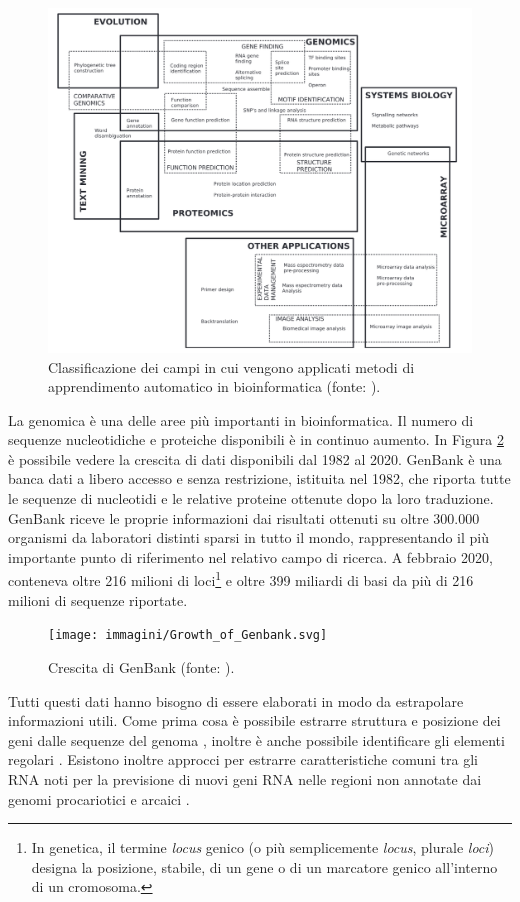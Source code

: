 \documentclass[12pt,italian]{report}
\begin{document}
	\begin{figure}[h]
		\centering
		\includegraphics[width=1\linewidth]{immagini/utilizziMachineLearningBioinfo}
		\caption[]{Classificazione dei campi in cui vengono applicati metodi di apprendimento automatico in bioinformatica (fonte: \cite{Machine_Learning_in_Bioinformatics}).}
		\label{fig:utilizzimachinelearningbioinfo}
	\end{figure}

	La genomica è una delle aree più importanti in bioinformatica. Il numero di sequenze nucleotidiche e proteiche disponibili è in continuo aumento. In Figura \ref{fig:growthofgenbank} è possibile vedere la crescita di dati disponibili dal 1982 al 2020. GenBank è una banca dati a libero accesso e senza restrizione, istituita nel 1982, che riporta tutte le sequenze di nucleotidi e le relative proteine ottenute dopo la loro traduzione. GenBank riceve le proprie informazioni dai risultati ottenuti su oltre 300.000 organismi da laboratori distinti sparsi in tutto il mondo, rappresentando il più importante punto di riferimento nel relativo campo di ricerca. A febbraio 2020, conteneva oltre 216 milioni di loci\footnote{In genetica, il termine \textit{locus} genico (o più semplicemente \textit{locus}, plurale \textit{loci}) designa la posizione, stabile, di un gene o di un marcatore genico all'interno di un cromosoma.} e oltre 399 miliardi di basi da più di 216 milioni di sequenze riportate.

	\begin{figure}[h]
		\centering
		\texttt{[image: immagini/Growth\_of\_Genbank.svg]}
		\caption{Crescita di GenBank (fonte: \cite{geneBANK}).}
		\label{fig:growthofgenbank}
	\end{figure}
	Tutti questi dati hanno bisogno di essere elaborati in modo da estrapolare informazioni utili. Come prima cosa  è possibile estrarre struttura e posizione dei geni dalle sequenze del genoma \cite{Mathe2002-us}, inoltre è anche possibile identificare gli elementi regolari \cite{Aerts2004-jh}. Esistono inoltre approcci per estrarre caratteristiche comuni tra gli RNA noti per la previsione di nuovi geni RNA nelle regioni non annotate dai genomi procariotici e arcaici \cite{Carter2001-oo}.
	
\end{document}
